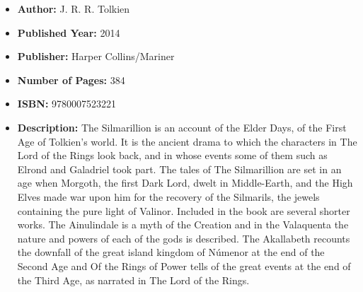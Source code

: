 \documentclass{tufte-handout}
\begin{document}
\begin{itemize}
    \item[] \textbf{Author:} J. R. R. Tolkien
    \item[] \textbf{Published Year:} 2014
    \item[] \textbf{Publisher:} Harper Collins/Mariner
    \item[] \textbf{Number of Pages:} 384      
    \item[] \textbf{ISBN:} 9780007523221
    \item[] \textbf{Description:} The Silmarillion is an account of the Elder Days, of the First Age of Tolkien’s world. It is the ancient drama to which the characters in The Lord of the Rings look back, and in whose events some of them such as Elrond and Galadriel took part. The tales of The Silmarillion are set in an age when Morgoth, the first Dark Lord, dwelt in Middle-Earth, and the High Elves made war upon him for the recovery of the Silmarils, the jewels containing the pure light of Valinor. Included in the book are several shorter works. The Ainulindale is a myth of the Creation and in the Valaquenta the nature and powers of each of the gods is described. The Akallabeth recounts the downfall of the great island kingdom of Númenor at the end of the Second Age and Of the Rings of Power tells of the great events at the end of the Third Age, as narrated in The Lord of the Rings.
\end{itemize}
\end{document}
